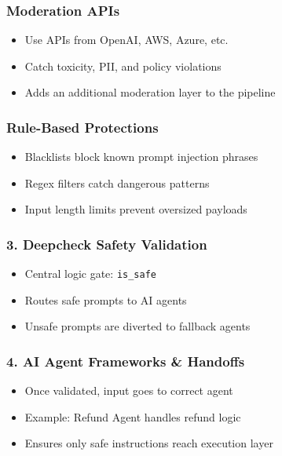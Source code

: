\begin{frame}[fragile]\frametitle{Moderation APIs}
    \begin{itemize}
        \item Use APIs from OpenAI, AWS, Azure, etc.
        \item Catch toxicity, PII, and policy violations
        \item Adds an additional moderation layer to the pipeline
    \end{itemize}
\end{frame}

\begin{frame}[fragile]\frametitle{Rule-Based Protections}
    \begin{itemize}
        \item Blacklists block known prompt injection phrases
        \item Regex filters catch dangerous patterns
        \item Input length limits prevent oversized payloads
    \end{itemize}
\end{frame}

\begin{frame}[fragile]\frametitle{3. Deepcheck Safety Validation}
    \begin{itemize}
        \item Central logic gate: \texttt{is\_safe}
        \item Routes safe prompts to AI agents
        \item Unsafe prompts are diverted to fallback agents
    \end{itemize}
\end{frame}

\begin{frame}[fragile]\frametitle{4. AI Agent Frameworks \& Handoffs}
    \begin{itemize}
        \item Once validated, input goes to correct agent
        \item Example: Refund Agent handles refund logic
        \item Ensures only safe instructions reach execution layer
    \end{itemize}
\end{frame}

